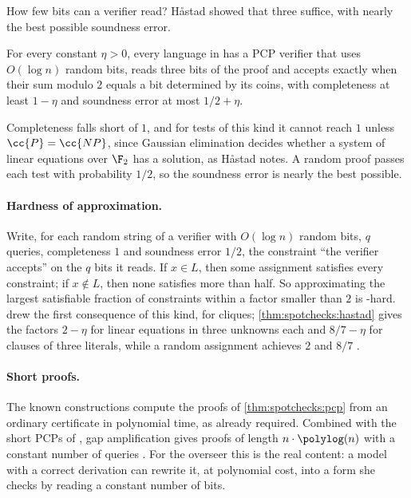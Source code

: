 \begin{refsection}
How few bits can a verifier read? Håstad showed that three suffice, with nearly the best possible soundness error.

\begin{theorem}\label{thm:spotchecks:hastad}
For every constant $\eta>0$, every language in  has a PCP verifier that uses $O(\log n)$ random bits, reads three bits of the proof and accepts exactly when their sum modulo $2$ equals a bit determined by its coins, with completeness at least $1-\eta$ and soundness error at most $1/2+\eta$.
\end{theorem}

Completeness falls short of $1$, and for tests of this kind it cannot reach $1$ unless $\cc{P}=\cc{NP}$, since Gaussian elimination decides whether a system of linear equations over $\F_2$ has a solution, as Håstad notes. A random proof passes each test with probability $1/2$, so the soundness error is nearly the best possible.

\paragraph{Hardness of approximation.} Write, for each random string of a verifier with $O(\log n)$ random bits, $q$ queries, completeness $1$ and soundness error $1/2$, the constraint ``the verifier accepts'' on the $q$ bits it reads. If $x\in L$, then some assignment satisfies every constraint; if $x\notin L$, then none satisfies more than half. So approximating the largest satisfiable fraction of constraints within a factor smaller than $2$ is -hard. \Textcite{FeigeEtAl1996} drew the first consequence of this kind, for cliques; \cref{thm:spotchecks:hastad} gives the factors $2-\eta$ for linear equations in three unknowns each and $8/7-\eta$ for clauses of three literals, while a random assignment achieves $2$ and $8/7$ \parencite{Hastad2001}.

\paragraph{Short proofs.} The known constructions compute the proofs of \cref{thm:spotchecks:pcp} from an ordinary certificate in polynomial time, as \textcite{BabaiEtAl1991} already required. Combined with the short PCPs of \textcite{BenSassonSudan2008}, gap amplification gives proofs of length $n\cdot\polylog(n)$ with a constant number of queries \parencite{Dinur2007}. For the overseer this is the real content: a model with a correct derivation can rewrite it, at polynomial cost, into a form she checks by reading a constant number of bits.


\end{refsection}
